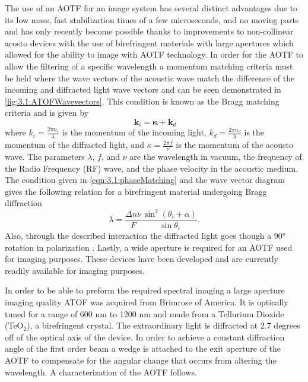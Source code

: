\documentclass[12pt]{article}
\begin{document}
The use of an AOTF for an image system has several distinct advantages due to its low mass, fast stabilization times of a few microseconds, and no moving parts and has only recently become possible thanks to improvements to non-collinear acosto devices with the use of birefringent materials with large apertures \citep{Chang1974, Voloshinov2007} which allowed for the ability to image with AOTF technology. In order for the AOTF to allow the filtering of a specific wavelength a momentum matching criteria must be held where the wave vectors of the acoustic wave match the difference of the incoming and diffracted light wave vectors and can be seen demonstrated in \autoref{fig:3.1:ATOFWavevectors}. This condition is known as the Bragg matching criteria and is given by
\begin{equation}
    \ \mathbf{k}_{i} = \boldsymbol\kappa + \mathbf{k}_{d}
    \label{eqn:3.1:phaseMatching}
\end{equation}
where ${k}_{i} = \frac{2\pi n_{i}}{\lambda}$ is the momentum of the incoming light, ${k}_{d} = \frac{2\pi n_{d}}{\lambda}$ is the momentum of the diffracted light, and $\kappa = \frac{2\pi f}{\nu}$ is the momentum of the acousto wave. The parameters $\lambda$, $f$, and $\nu$ are the wavelength in vacuum, the frequency of the Radio Frequency (RF) wave, and the phase velocity in the acoustic medium. The condition given in \autoref{eqn:3.1:phaseMatching} and the wave vector diagram gives the following relation for a birefringent material undergoing Bragg diffraction
\begin{equation}
    \lambda  = \frac{\Delta n\nu}{F}\frac{\sin^{2}(\theta_{i}+\alpha)}{\sin\theta_{i}}.
    \label{eqn:3.1:AOTFWavelengthDependance}
\end{equation}
Also, through the described interaction the diffracted light goes though a 90\si{\degree} rotation in polarization \citep{Voloshinov1996}. Lastly, a wide aperture is required for an AOTF used for imaging purposes. These devices have been developed \citep{Gass1991} and are currently readily available for imaging purposes.

In order to be able to preform the required spectral imaging a large aperture imaging quality ATOF was acquired from Brimrose of America. It is optically tuned for a range of 600 nm to 1200 nm and made from a Tellurium Dioxide (TeO$_{2}$), a birefringent crystal. The extraordinary light is diffracted at 2.7 degrees off of the optical axis of the device. In order to achieve a constant diffraction angle of the first order beam a wedge is attached to the exit aperture of the AOTF to compensate for the angular change that occurs from altering the wavelength. A characterization of the AOTF follows.
\end{document}
